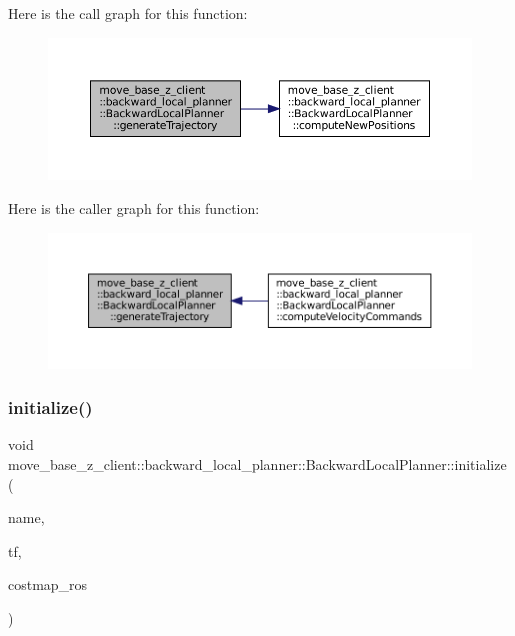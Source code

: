 Here is the call graph for this function\+:
\nopagebreak
\begin{figure}[H]
\begin{center}
\leavevmode
\includegraphics[width=350pt]{classmove__base__z__client_1_1backward__local__planner_1_1BackwardLocalPlanner_a5da53f29e43639a9af5ba3b640e6bf8c_cgraph}
\end{center}
\end{figure}
Here is the caller graph for this function\+:
\nopagebreak
\begin{figure}[H]
\begin{center}
\leavevmode
\includegraphics[width=350pt]{classmove__base__z__client_1_1backward__local__planner_1_1BackwardLocalPlanner_a5da53f29e43639a9af5ba3b640e6bf8c_icgraph}
\end{center}
\end{figure}
\mbox{\label{classmove__base__z__client_1_1backward__local__planner_1_1BackwardLocalPlanner_ac2cd25cd0be3bfc945826af5e9f0d5d0}} 
\subsubsection{\texorpdfstring{initialize()}{initialize()}\hspace{0.1cm}{\footnotesize\ttfamily [1/3]}}
{\footnotesize\ttfamily void move\+\_\+base\+\_\+z\+\_\+client\+::backward\+\_\+local\+\_\+planner\+::\+Backward\+Local\+Planner\+::initialize (\begin{DoxyParamCaption}\item[{std\+::string}]{name,  }\item[{tf\+::\+Transform\+Listener $\ast$}]{tf,  }\item[{costmap\+\_\+2d\+::\+Costmap2\+D\+R\+OS $\ast$}]{costmap\+\_\+ros }\end{DoxyParamCaption})}



